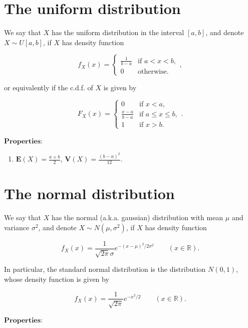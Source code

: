 \documentclass[11pt]{report}
\newcommand{\R}{\mathbb{R}}
\theoremstyle{plain}
\theoremstyle{definition}
\begin{document}
\section{The uniform distribution}

We say that $X$ has the uniform distribution in the
interval $[a,b]$, and denote $X\sim U[a,b]$, if $X$
has density function

\[
f_X(x) = \begin{cases} \frac{1}{b-a} & \textrm{if }a<x<b, \\ 0 & \textrm{otherwise}. \end{cases},
\]

\noindent or equivalently if the c.d.f. of $X$ is given by

\[
F_X(x) = \begin{cases} 0 & \textrm{if }x<a, \\
\frac{x-a}{b-a} & \textrm{if }a\le x\le b, \\
1 & \textrm{if }x>b. \end{cases}.
\]

\noindent $\textbf{Properties:}$

\begin{enumerate}[label=\arabic*.]
\item $\mathbf{E}(X) = \frac{a+b}{2}$,
$\mathbf{V}(X) = \frac{(b-a)^2}{12}$.
\end{enumerate}

\section{The normal distribution}
\label{sec:normal-dist}

We say that $X$ has the normal (a.k.a. gaussian)
distribution with mean $\mu$ and variance $\sigma^2$,
and denote $X\sim N(\mu,\sigma^2)$, if $X$ has
density function

\[
f_X(x) = \frac{1}{\sqrt{2\pi} \sigma} e^{-(x-\mu)^2/2\sigma^2} \qquad (x\in\R).
\]

\noindent In particular, the standard normal distribution is
the distribution $N(0,1)$, whose density function is
given by

\[
f_X(x) = \frac{1}{\sqrt{2\pi}} e^{-x^2/2} \qquad (x\in\R).
\]

\noindent $\textbf{Properties:}$
\end{document}
